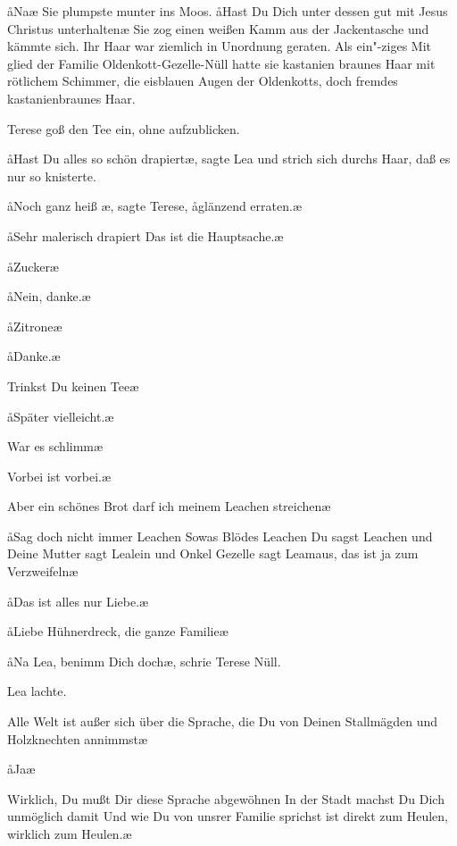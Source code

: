 \aa{}Na\frag{}\ae{} Sie plumpste munter ins Moos. \aa{}Hast Du Dich unter\-%
dessen gut mit Jesus Christus unterhalten\frag{}\ae{} Sie zog einen
weißen Kamm aus der Jackentasche und kämmte sich. Ihr
Haar war ziemlich in Unordnung geraten. Als ein"-ziges Mit\-%
glied der Familie Oldenkott-Gezelle-Nüll hatte sie kastanien\-%
braunes Haar mit rötlichem Schimmer, die eisblauen Augen
der Oldenkotts, doch fremdes kastanienbraunes Haar.

Terese goß den Tee ein, ohne aufzublicken.

\aa{}Hast Du alles so schön drapiert\frag{}\ae{}, sagte Lea und strich sich
durchs Haar, daß es nur so knisterte.

\aa{}Noch ganz heiß%
\eingriff{heiß\ae{}, sagte ] heiß,\ae{} sagte}\ae{},
sagte Terese, \aa{}glänzend erraten.\ae{}

\aa{}Sehr malerisch drapiert\ausr{} Das ist die Hauptsache.\ae{}

\aa{}Zucker\frag{}\ae{}

\aa{}Nein, danke.\ae{}

\aa{}Zitrone\frag{}\ae{}

\aa{}Danke.\ae{}

\aanah{}Trinkst Du keinen Tee\frag{}\ae{}

\aa{}Später vielleicht.\ae{}

\aanah{}War es schlimm\frag{}\ae{}

\aanah{}Vorbei ist vorbei.\ae{}

\aanah{}Aber ein schönes Brot darf ich meinem Leachen streichen\frag{}\ae{}

\aa{}Sag doch nicht immer Leachen\ausr{} Sowas Blödes\ausr{} Leachen\ausr{}
Du sagst Leachen und Deine Mutter sagt Lealein und Onkel
Gezelle sagt Leamaus, das ist ja zum Verzweifeln\ausr{}\ae{}

\aa{}Das ist alles nur Liebe.\ae{}

\aa{}Liebe\ausr{} Hühnerdreck, die ganze Familie\ausr{}\ae{}

\aa{}Na Lea, benimm Dich doch\ae{}, schrie Terese Nüll.

Lea lachte.

\aanah{}Alle Welt ist außer sich über die Sprache, die Du von Deinen
Stallmägden und Holzknechten annimmst\ausr{}\ae{}

\aa{}Ja\frag{}\ae{}

\aanah{}Wirklich, Du mußt Dir diese Sprache abgewöhnen\ausr{} In der
Stadt machst Du Dich unmöglich damit\ausr{} Und wie Du von
unsrer Familie sprichst ist direkt zum Heulen, wirklich zum
Heulen.\ae{}

